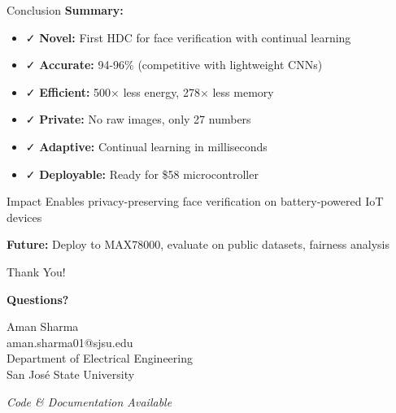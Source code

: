 \documentclass[aspectratio=169]{beamer}
\begin{document}
\begin{frame}{Conclusion}
\textbf{Summary:}
\begin{itemize}
    \item ✓ \textbf{Novel:} First HDC for face verification with continual learning
    \item ✓ \textbf{Accurate:} 94-96\% (competitive with lightweight CNNs)
    \item ✓ \textbf{Efficient:} 500× less energy, 278× less memory
    \item ✓ \textbf{Private:} No raw images, only 27 numbers
    \item ✓ \textbf{Adaptive:} Continual learning in milliseconds
    \item ✓ \textbf{Deployable:} Ready for \$58 microcontroller
\end{itemize}

\vspace{1em}
\begin{block}{Impact}
Enables privacy-preserving face verification on battery-powered IoT devices
\end{block}

\textbf{Future:} Deploy to MAX78000, evaluate on public datasets, fairness analysis
\end{frame}

\begin{frame}[standout]
\Huge Thank You!

\vspace{2em}

\large
\textbf{Questions?}

\vspace{2em}

\normalsize
Aman Sharma\\
aman.sharma01@sjsu.edu\\
Department of Electrical Engineering\\
San José State University

\vspace{1em}
\small
\textit{Code \& Documentation Available}
\end{frame}
\end{document}
